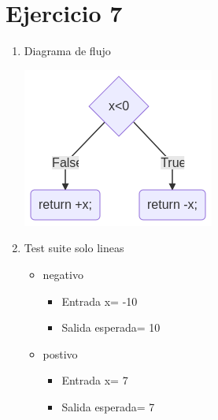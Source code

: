 \documentclass{article}
\begin{document}
\section*{Ejercicio 7}

\begin{enumerate}
    \item Diagrama de flujo
    
    \includegraphics[scale=0.65]{recursos/fabs.png}

    \item Test suite solo lineas
        \begin{itemize}
            \item negativo
                \begin{itemize}
                    \item Entrada x= -10
                    \item Salida esperada= 10
                \end{itemize}
            \item postivo
                \begin{itemize}
                    \item Entrada x= 7
                    \item Salida esperada= 7
                \end{itemize}
        \end{itemize}
\end{enumerate}
\end{document}
